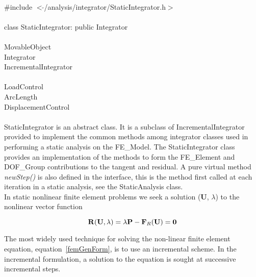 
   \\
\indent \#include $<\tilde{ }$/analysis/integrator/StaticIntegrator.h$>$  \\

  \\
\indent class StaticIntegrator: public Integrator  \\

 \\
\indent MovableObject \\
\indent\indent Integrator \\
\indent\indent\indent IncrementalIntegrator \\
\indent\indent\indent{} \\
\indent\indent\indent\indent\indent LoadControl \\
\indent\indent\indent\indent\indent ArcLength \\
\indent\indent\indent\indent\indent DisplacementControl \\

 \\ 
\indent StaticIntegrator is an abstract class. It is a subclass of
IncrementalIntegrator provided to implement the common methods among
integrator classes used in performing a static analysis on the
FE\_Model. The StaticIntegrator class provides an implementation of
the methods to form the FE\_Element and DOF\_Group contributions to
the tangent and residual. A pure virtual method {\em newStep()} is
also defined in the interface, this is the method first called at each
iteration in a static analysis, see the StaticAnalysis class. \\

In static nonlinear finite element problems we seek a solution
($\mathbf{U}$, $\lambda$) to the nonlinear vector function

\begin{equation}
{\bf R}({\bf U}, \lambda) = \lambda {\bf P} - {\bf F}_R({\bf U}) = {\bf 0}
\label{staticGenForm}
\end{equation}

The most widely used technique for solving the non-linear finite
element equation, equation~\ref{femGenForm}, is to use an incremental
scheme. In the incremental formulation, a solution to the equation is
sought at successive incremental steps.  

